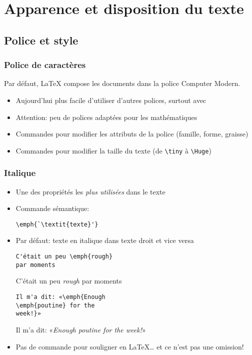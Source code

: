 \section{Apparence et disposition du texte}

\subsection{Police et style}

\begin{frame}[fragile=singleslide]
  \frametitle{Police de caractères}

  Par défaut, {\LaTeX} compose les documents dans la police
  {\CM Computer Modern}.

  \begin{itemize}
  \item Aujourd'hui plus facile d'utiliser d'autres polices, surtout
    avec {\XeLaTeX}
  \item \alert{Attention}: peu de polices adaptées pour les
    mathématiques
  \item Commandes pour modifier les \alert{attributs} de la police
    (famille, forme, graisse)
  \item Commandes pour modifier la \alert{taille} du texte (de
    \verb=\tiny= à \verb=\Huge=)
  \end{itemize}
\end{frame}

\begin{frame}[fragile]
  \frametitle{Italique}
  \begin{itemize}
  \item<1-> Une des propriétés les \emph{plus utilisées} dans le texte
    \vfill
  \item<1-> Commande sémantique:
\begin{lstlisting}
\emph{`\textit{texte}'}
\end{lstlisting}
    \vfill
  \item<2-> Par défaut: texte en italique dans texte droit et vice versa
    \begin{demo}
      \small
      \begin{texample}[0.48\linewidth]
\begin{lstlisting}
C'était un peu \emph{rough}
par moments
\end{lstlisting}
        \producing
        C'était un peu \emph{rough} par moments
      \end{texample}

      \begin{texample}[0.48\linewidth]
\begin{lstlisting}
Il m'a dit: «\emph{Enough
\emph{poutine} for the
week!}»
\end{lstlisting}
        \producing
        Il m'a dit: «\emph{Enough \emph{poutine} for the week!}»
      \end{texample}
    \end{demo}
  \item<3-> Pas de commande pour souligner en {\LaTeX\dots} et ce n'est
    pas une omission!
  \end{itemize}
\end{frame}

